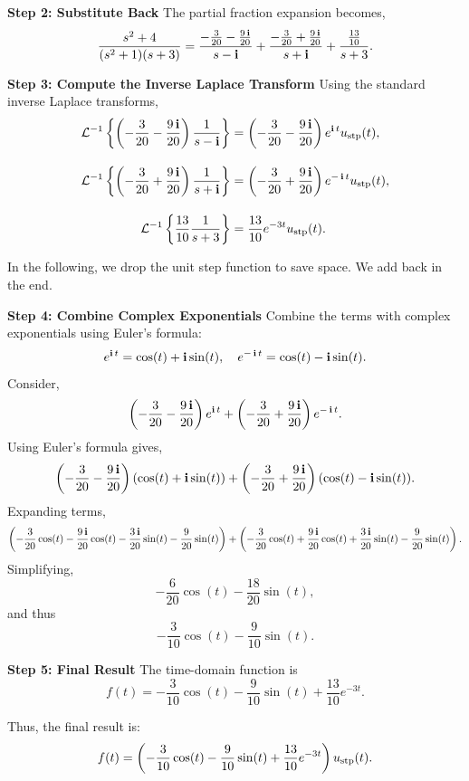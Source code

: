 \begin{enumerate}
\textbf{Step 2: Substitute Back}
The partial fraction expansion becomes,
\[
\frac{s^2 + 4}{(s^2 + 1)(s + 3)} = \frac{-\frac{3}{20} - \frac{9 \mathop{\bm{\mathrm i}}}{20}}{s - \mathop{\bm{\mathrm i}}} + \frac{-\frac{3}{20} + \frac{9 \mathop{\bm{\mathrm i}}}{20}}{s + \mathop{\bm{\mathrm i}}} + \frac{\frac{13}{10}}{s + 3}.
\]

\textbf{Step 3: Compute the Inverse Laplace Transform}
Using the standard inverse Laplace transforms,
\[
\begin{aligned}
\mathcal{L}^{-1}\left\{ \left(-\frac{3}{20} - \frac{9 \mathop{\bm{\mathrm i}}}{20} \right)\frac{1}{s - \mathop{\bm{\mathrm i}}}\right\} &= \left(-\frac{3}{20} - \frac{9 \mathop{\bm{\mathrm i}}}{20}\right) e^{\mathop{\bm{\mathrm i}} t} u_{\rm stp}(t), \\[1em]
\mathcal{L}^{-1}\left\{\left(-\frac{3}{20} + \frac{9 \mathop{\bm{\mathrm i}}}{20}\right) \frac{1}{s + \mathop{\bm{\mathrm i}}}\right\} &= \left(-\frac{3}{20} + \frac{9 \mathop{\bm{\mathrm i}}}{20}\right) e^{-\mathop{\bm{\mathrm i}} t} u_{\rm stp}(t), \\[1em]
\mathcal{L}^{-1}\left\{\frac{13}{10}\frac{1}{s + 3}\right\} &= \frac{13}{10} e^{-3t} u_{\rm stp}(t).    
\end{aligned}
\]

In the following, we drop the unit step function to save space. We add back in the end.

\textbf{Step 4: Combine Complex Exponentials}
Combine the terms with complex exponentials using Euler's formula:
\[
e^{\mathop{\bm{\mathrm i}} t} = \cos(t) + \mathop{\bm{\mathrm i}} \sin(t), \quad e^{-\mathop{\bm{\mathrm i}} t} = \cos(t) - \mathop{\bm{\mathrm i}} \sin(t).
\]
Consider,
\[
\left(-\frac{3}{20} - \frac{9 \mathop{\bm{\mathrm i}}}{20}\right) e^{\mathop{\bm{\mathrm i}} t} + \left(-\frac{3}{20} + \frac{9 \mathop{\bm{\mathrm i}}}{20}\right) e^{-\mathop{\bm{\mathrm i}} t}.
\]
Using Euler's formula gives,
\[
\left(-\frac{3}{20} - \frac{9 \mathop{\bm{\mathrm i}}}{20}\right)(\cos(t) + \mathop{\bm{\mathrm i}} \sin(t)) + \left(-\frac{3}{20} + \frac{9 \mathop{\bm{\mathrm i}}}{20}\right)(\cos(t) - \mathop{\bm{\mathrm i}} \sin(t)).
\]
Expanding terms,
\[
\left(-\frac{3}{20}\cos(t) - \frac{9 \mathop{\bm{\mathrm i}}}{20}\cos(t) - \frac{3 \mathop{\bm{\mathrm i}}}{20}\sin(t) - \frac{9}{20}\sin(t)\right) + \left(-\frac{3}{20}\cos(t) + \frac{9 \mathop{\bm{\mathrm i}}}{20}\cos(t) + \frac{3 \mathop{\bm{\mathrm i}}}{20}\sin(t) - \frac{9}{20}\sin(t)\right).
\]
Simplifying,
\[
-\frac{6}{20}\cos(t) - \frac{18}{20}\sin(t),
\]
and thus
\[
-\frac{3}{10}\cos(t) - \frac{9}{10}\sin(t).
\]

\textbf{Step 5: Final Result}
The time-domain function is
\[
f(t) = -\frac{3}{10} \cos(t) - \frac{9}{10} \sin(t) + \frac{13}{10} e^{-3t}.
\]

Thus, the final result is:
\[
f(t) = \left(-\frac{3}{10} \cos(t) - \frac{9}{10} \sin(t) + \frac{13}{10} e^{-3t}\right) u_{\rm stp}(t).
\]
\end{enumerate}

\Qed



